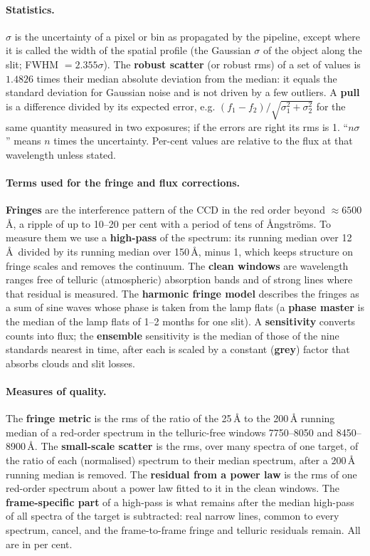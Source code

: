 \paragraph{Statistics.} $\sigma$ is the uncertainty of a pixel or bin as propagated by the pipeline, except where it is called the
width of the spatial profile (the Gaussian $\sigma$ of the object along the slit; FWHM $=2.355\sigma$). The
\textbf{robust scatter} (or robust rms) of a set of values is $1.4826$ times their median absolute deviation from the
median: it equals the standard deviation for Gaussian noise and is not driven by a few outliers. A \textbf{pull} is a
difference divided by its expected error, e.g. $(f_1-f_2)/\sqrt{\sigma_1^2+\sigma_2^2}$ for the same quantity measured
in two exposures; if the errors are right its rms is 1. ``$n\sigma$'' means $n$ times the uncertainty. Per-cent
values are relative to the flux at that wavelength unless stated.

\paragraph{Terms used for the fringe and flux corrections.} \textbf{Fringes} are the interference pattern of the CCD
in the red order beyond $\approx6500$\,\AA, a ripple of up to 10--20 per cent with a period of tens of \AA ngstr\"oms.
To measure them we use a \textbf{high-pass} of the spectrum: its running median over 12\,\AA\ divided by its running
median over 150\,\AA, minus 1, which keeps structure on fringe scales and removes the continuum. The \textbf{clean
windows} are wavelength ranges free of telluric (atmospheric) absorption bands and of strong lines where that
residual is measured. The \textbf{harmonic fringe model} describes the fringes as a sum of sine waves whose phase is
taken from the lamp flats (a \textbf{phase master} is the median of the lamp flats of 1--2 months for one slit). A
\textbf{sensitivity} converts counts into flux; the \textbf{ensemble} sensitivity is the median of those of the nine
standards nearest in time, after each is scaled by a constant (\textbf{grey}) factor that absorbs clouds and slit
losses.

\paragraph{Measures of quality.} The \textbf{fringe metric} is the rms of the ratio of the 25\,\AA{} to the
200\,\AA{} running median of a red-order spectrum in the telluric-free windows 7750--8050 and 8450--8900\,\AA. The
\textbf{small-scale scatter} is the rms, over many spectra of one target, of the ratio of each (normalised) spectrum
to their median spectrum, after a 200\,\AA{} running median is removed. The \textbf{residual from a power law} is
the rms of one red-order spectrum about a power law fitted to it in the clean windows. The
\textbf{frame-specific part} of a high-pass is what remains after the median high-pass of all spectra of the target is
subtracted: real narrow lines, common to every spectrum, cancel, and the frame-to-frame fringe and telluric residuals
remain. All are in per cent.

